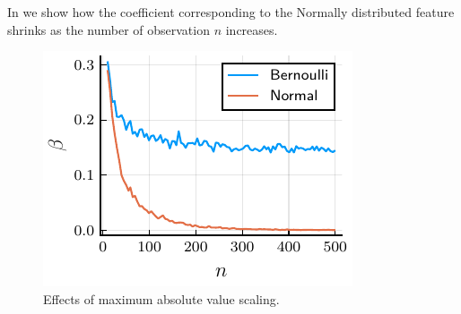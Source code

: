 In  we show how the coefficient corresponding to the Normally distributed feature shrinks as the number of observation \(n\) increases.

\begin{figure}[htpb]
  \centering
  \includegraphics[]{plots/maxabs_n.pdf}
  \caption{%
    Effects of maximum absolute value scaling.
  }
  \label{fig:maxabs-n}
\end{figure}

\printbibliography


